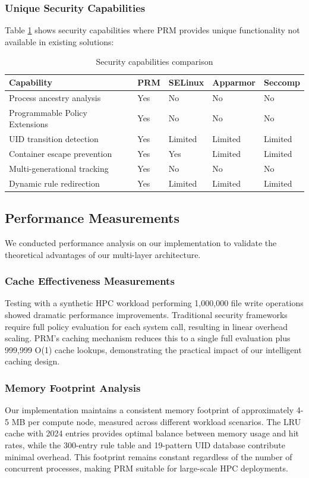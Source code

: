 \documentclass[conference]{IEEEtran}
\begin{document}
\subsubsection{Unique Security Capabilities}
Table \ref{tab:capabilities} shows security capabilities where PRM provides unique functionality not available in existing solutions:

\begin{table}[htbp]
\caption{Security capabilities comparison}
\label{tab:capabilities}
\centering
\begin{tabular}{@{}p{3.0cm}p{0.3cm}p{0.7cm}p{0.9cm}p{0.8cm}@{}}
\toprule
\textbf{Capability} & \textbf{PRM} & \textbf{SELinux} & \textbf{Apparmor} & \textbf{Seccomp} \\
\midrule
Process ancestry analysis & Yes & No & No & No \\
Programmable Policy Extensions & Yes & No & No & No \\
UID transition detection & Yes & Limited & Limited & Limited \\
Container escape prevention & Yes & Yes & Limited & Limited \\
Multi-generational tracking & Yes & No & No & No \\
Dynamic rule redirection & Yes & Limited & Limited & Limited \\
\bottomrule
\end{tabular}
\end{table}

\subsection{Performance Measurements}
We conducted performance analysis on our implementation to validate the theoretical advantages of our multi-layer architecture.

\subsubsection{Cache Effectiveness Measurements}
Testing with a synthetic HPC workload performing 1,000,000 file write operations showed dramatic performance improvements. Traditional security frameworks require full policy evaluation for each system call, resulting in linear overhead scaling. PRM's caching mechanism reduces this to a single full evaluation plus 999,999 O(1) cache lookups, demonstrating the practical impact of our intelligent caching design.

\subsubsection{Memory Footprint Analysis}
Our implementation maintains a consistent memory footprint of approximately 4-5 MB per compute node, measured across different workload scenarios. The LRU cache with 2024 entries provides optimal balance between memory usage and hit rates, while the 300-entry rule table and 19-pattern UID database contribute minimal overhead. This footprint remains constant regardless of the number of concurrent processes, making PRM suitable for large-scale HPC deployments.
\end{document}
